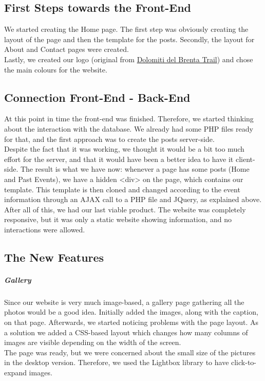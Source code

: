 \documentclass[a4paper]{article}
\begin{document}
	\subsection{First Steps towards the Front-End}
	We started creating the Home page. The first step was obviously creating the layout of the page and then the template for the posts. Secondly, the layout for About and Contact pages were created.\\
	Lastly, we created our logo (original from \href{https://goo.gl/yTRScL}{Dolomiti del Brenta Trail}) and chose the main colours for the website.
	
	\subsection{Connection Front-End - Back-End}
	At this point in time the front-end was finished. Therefore, we started thinking about the interaction with the database. We already had some PHP files ready for that, and the first approach was to create the posts server-side.\\
	Despite the fact that it was working, we thought it would be a bit too much effort for the server, and that it would have been a better idea to have it client-side. The result is what we have now: whenever a page has some posts (Home and Past Events), we have a hidden <div> on the page, which contains our template. This template is then cloned and changed according to the event information through an AJAX call to a PHP file and JQuery, as explained above.\\
	After all of this, we had our last viable product. The website was completely responsive, but it was only a static website showing information, and no interactions were allowed.

	\subsection{The New Features}
	\subparagraph{Gallery}
	Since our website is very much image-based, a gallery page gathering all the photos would be a good idea. Initially added the images, along with the caption, on that page. Afterwards, we started noticing problems with the page layout. As a solution we added a CSS-based layout which changes how many columns of images are visible depending on the width of the screen.\\
	The page was ready, but we were concerned about the small size of the pictures in the desktop version. Therefore, we used the Lightbox library to have click-to-expand images.
	
\end{document}
